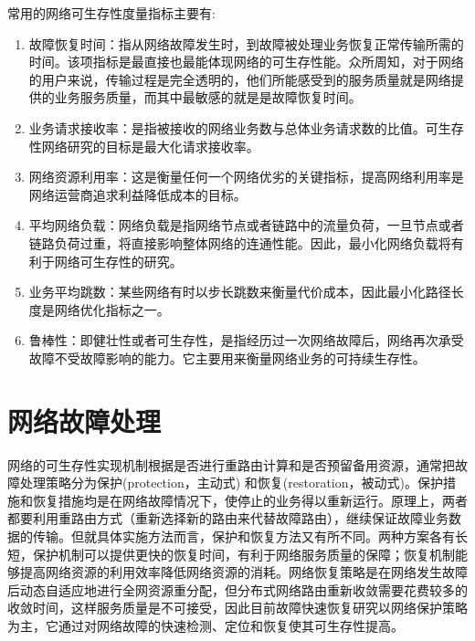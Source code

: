 常用的网络可生存性度量指标主要有:
\begin{enumerate}
  \item 故障恢复时间：指从网络故障发生时，到故障被处理业务恢复正常传输所需的时间。该项指标是最直接也最能体现网络的可生存性能。众所周知，对于网络的用户来说，传输过程是完全透明的，他们所能感受到的服务质量就是网络提供的业务服务质量，而其中最敏感的就是是故障恢复时间。
  \item 业务请求接收率：是指被接收的网络业务数与总体业务请求数的比值。可生存性网络研究的目标是最大化请求接收率。
  \item 网络资源利用率：这是衡量任何一个网络优劣的关键指标，提高网络利用率是网络运营商追求利益降低成本的目标。
  \item 平均网络负载：网络负载是指网络节点或者链路中的流量负荷，一旦节点或者链路负荷过重，将直接影响整体网络的连通性能。因此，最小化网络负载将有利于网络可生存性的研究。
  \item 业务平均跳数：某些网络有时以步长跳数来衡量代价成本，因此最小化路径长度是网络优化指标之一。
  \item 鲁棒性：即健壮性或者可生存性，是指经历过一次网络故障后，网络再次承受故障不受故障影响的能力。它主要用来衡量网络业务的可持续生存性。
\end{enumerate}



\section{网络故障处理}

网络的可生存性实现机制根据是否进行重路由计算和是否预留备用资源，通常把故障处理策略分为保护(protection，主动式) 和恢复(restoration，被动式)。保护措施和恢复措施均是在网络故障情况下，使停止的业务得以重新运行。原理上，两者都要利用重路由方式（重新选择新的路由来代替故障路由），继续保证故障业务数据的传输。但就具体实施方法而言，保护和恢复方法又有所不同。两种方案各有长短，保护机制可以提供更快的恢复时间，有利于网络服务质量的保障；恢复机制能够提高网络资源的利用效率降低网络资源的消耗。网络恢复策略是在网络发生故障后动态自适应地进行全网资源重分配，但分布式网络路由重新收敛需要花费较多的收敛时间，这样服务质量是不可接受，因此目前故障快速恢复研究以网络保护策略为主，它通过对网络故障的快速检测、定位和恢复使其可生存性提高。



